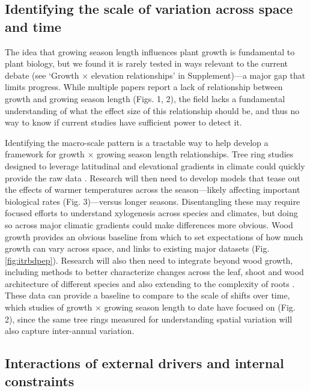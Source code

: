 \documentclass[11pt]{article}
\begin{document}
\subsection*{Identifying the scale of variation across space and time} %

The idea that growing season length influences plant growth is fundamental to plant biology, but we found it is rarely tested in ways relevant to the current debate (see `Growth $\times$ elevation relationships' in Supplement)---a major gap that limits progress. While multiple papers report a lack of relationship between growth and growing season length (Figs. 1, 2), the field lacks a fundamental understanding of what the effect size of this relationship should be, and thus no way to know if current studies have sufficient power to detect it. 

Identifying the macro-scale pattern is a tractable way to help develop a framework for growth $\times$ growing season length relationships. Tree ring studies designed to leverage latitudinal and elevational gradients in climate could quickly provide the raw data \citep{manzanedo2024moving}. Research will then need to develop models that tease out the effects of warmer temperatures across the season---likely affecting important biological rates  (Fig. 3)---versus longer seasons. Disentangling these may require focused efforts to understand xylogenesis across species and climates, but doing so across major climatic gradients could make differences more obvious. Wood growth provides an obvious baseline from which to set expectations of how much growth can vary across space, and links to existing major datasets (Fig. \ref{fig:itrbdpep}).  Research will also then need to integrate beyond wood growth, including methods to better characterize changes across the leaf, shoot and wood architecture of different species \citep[e.g.][]{puletti2020lidar,sillett2024ground} and also extending to the complexity of roots \citep{mckown2016impacts,radville2016}. These data can provide a baseline to compare to the scale of shifts over time, which studies of growth $\times$ growing season length to date have focused on (Fig. 2), since the same tree rings measured for understanding spatial variation will also capture inter-annual variation. 

\subsection*{Interactions of external drivers and internal constraints} %
\end{document}
